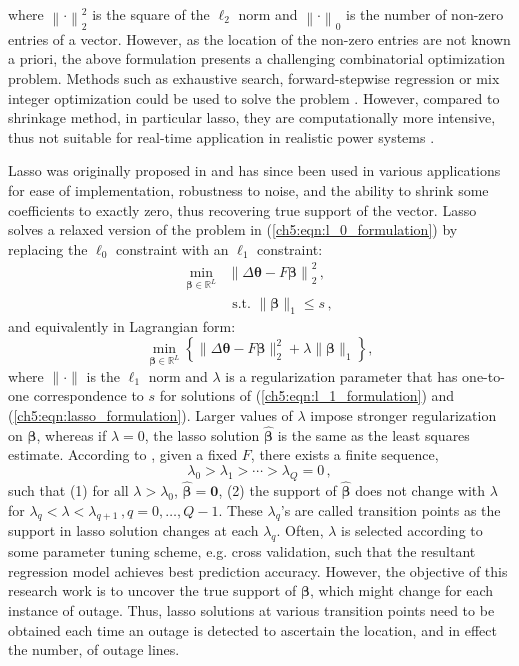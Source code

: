 where $\left\|\cdot\right\|^2_2$ is the square of the $\ell_2$ norm and $\left\|\cdot\right\|_0$ is the number of non-zero entries of a vector. However, as the location of the non-zero entries are not known a priori, the above formulation presents a challenging combinatorial optimization problem. Methods such as exhaustive search, forward-stepwise regression or mix integer optimization could be used to solve the problem \cite{bertsimas2020sparse}. However, compared to shrinkage method, in particular lasso, they are computationally more intensive, thus not suitable for real-time application in realistic power systems \cite{hastie2020best}. 

Lasso was originally proposed in \cite{tibshirani1996regression} and has since been used in various applications for ease of implementation, robustness to noise, and the ability to shrink some coefficients to exactly zero, thus recovering true support of the vector. Lasso solves a relaxed version of the problem in (\ref{ch5:eqn:l_0_formulation}) by replacing the $\ell_0$ constraint with an $\ell_1$ constraint:
\begin{align}
\label{ch5:eqn:l_1_formulation}
\underset{\boldsymbol{\beta}  \in \mathbb{R}^{L} }{\min} &\left\|\Delta\boldsymbol{\theta} - F\boldsymbol{\beta}\right\|_{2}^{2} \,, \\
& \text { s.t. }\|\boldsymbol{\beta}\|_{1} \le s \nonumber\,,
\end{align}
and equivalently in Lagrangian form:
\begin{equation}
\label{ch5:eqn:lasso_formulation}
\min_{\boldsymbol{\beta} \in \mathbb{R}^{L}}\left\{\|\Delta\boldsymbol{\theta} - F\boldsymbol{\beta}\|_{2}^{2}+\lambda\|\boldsymbol{\beta}\|_{1}\right\},
\end{equation}
where $\|\cdot\|$ is the $\ell_1$ norm and $\lambda$ is a regularization parameter that has one-to-one correspondence to $s$ for solutions of (\ref{ch5:eqn:l_1_formulation}) and (\ref{ch5:eqn:lasso_formulation}). Larger values of $\lambda$ impose stronger regularization on $\boldsymbol{\beta}$, whereas if $\lambda = 0$, the lasso solution $\boldsymbol{\hat{\beta}}$ is the same as the least squares estimate. According to \cite{zou2007degrees}, given a fixed $F$, there exists a finite sequence,
\begin{equation}
\label{ch5:eqn:transition_points}
\lambda_0 > \lambda_1 > \cdots > \lambda_Q = 0 \,,
\end{equation}
such that (1) for all $\lambda > \lambda_0$, $\boldsymbol{\hat{\beta}} = \mathbf{0}$, (2) the support of $\boldsymbol{\hat{\beta}}$ does not change with $\lambda$ for $\lambda_q < \lambda < \lambda_{q+1}\,, q=0, \dots, Q-1$. These $\lambda_q$'s are called transition points as the support in lasso solution changes at each $\lambda_q$. Often, $\lambda$ is selected according to some parameter tuning scheme, e.g. cross validation, such that the resultant regression model achieves best prediction accuracy. However, the objective of this research work is to uncover the true support of $\boldsymbol{\beta}$, which might change for each instance of outage. Thus, lasso solutions at various transition points need to be obtained each time an outage is detected to ascertain the location, and in effect the number, of outage lines. 

